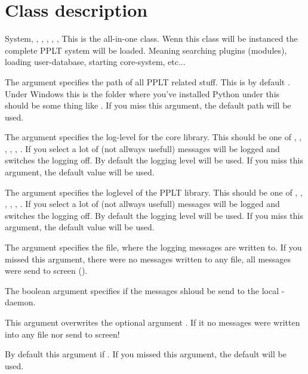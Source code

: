 \section{Class description}
\begin{classdesc}{System}{, , 
, , , 
, }
This is the all-in-one class. Wenn this class will be instanced the complete 
PPLT system will be loaded. Meaning searching plugins (modules), loading 
user-database, starting core-system, etc...

The argument  specifies the path of all PPLT related stuff. This 
is by default . Under Windows this is the folder 
where you've installed Python under \UNIX this should be some thing like 
. If you miss this argument, the default path will be 
used.

The argument  specifies the log-level for the core library. 
This should be one of , , , , 
, .  If you select  a lot of (not allways 
usefull) messages will be logged and  switches the logging off. 
By default the logging level  will be used. If you miss this 
argument, the default value will be used.

The argument  specifies the loglevel of the PPLT library. 
This should be one of , , , , 
, . If you select  a lot of (not allways 
usefull) messages will be logged and  switches the logging off. 
By default the logging level  will be used. If you miss this 
argument, the default value will be used.

The argument  specifies the file,  where the logging messages are
written to. If you missed this argument, there were no messages written to any
file, all messages were send to screen (). 

The boolean argument  specifies if the messages shloud be send to
the local -daemon. 
\begin{notice}
This argument overwrites the optional argument . If 
it  no messages were written into any file nor send to screen!
\end{notice}
By default this argument if . If you missed this argument, the 
default will be used.


\end{classdesc}
